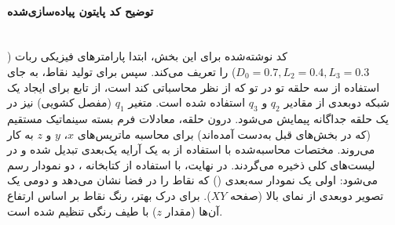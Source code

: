 \documentclass{article}
\begin{document}
\paragraph{توضیح کد پایتون پیاده‌سازی‌شده}\mbox{}\\
کد نوشته‌شده برای این بخش، ابتدا پارامترهای فیزیکی ربات ($D_0=0.7, L_2=0.4, L_3=0.3$) را تعریف می‌کند. سپس برای تولید نقاط، به جای استفاده از سه حلقه تو در تو که از نظر محاسباتی کند است، از تابع  برای ایجاد یک شبکه دوبعدی از مقادیر $q_2$ و $q_3$ استفاده شده است. متغیر $q_1$ (مفصل کشویی) نیز در یک حلقه جداگانه پیمایش می‌شود.
درون حلقه، معادلات فرم بسته سینماتیک مستقیم (که در بخش‌های قبل به‌دست آمده‌اند) برای محاسبه ماتریس‌های $x$، $y$ و $z$ به کار می‌روند. مختصات محاسبه‌شده با استفاده از  به یک آرایه یک‌بعدی تبدیل شده و در لیست‌های کلی ذخیره می‌گردند.
در نهایت، با استفاده از کتابخانه ، دو نمودار رسم می‌شود: اولی یک نمودار سه‌بعدی () که نقاط را در فضا نشان می‌دهد و دومی یک تصویر دوبعدی از نمای بالا (صفحه $XY$). برای درک بهتر، رنگ نقاط بر اساس ارتفاع آن‌ها (مقدار $z$) با طیف رنگی  تنظیم شده است. 
\end{document}
